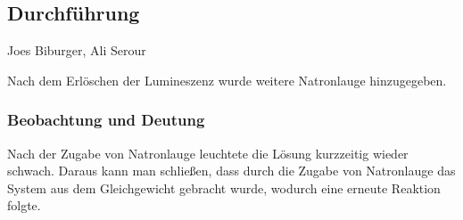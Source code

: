 \subsection{Durchf\"uhrung}
Joes Biburger, Ali Serour

Nach dem Erl\"oschen der Lumineszenz wurde weitere Natronlauge hinzugegeben.
\subsubsection{Beobachtung und Deutung}
Nach der Zugabe von Natronlauge leuchtete die L\"osung kurzzeitig wieder schwach.
Daraus kann man schließen, dass durch die Zugabe von Natronlauge das System aus dem Gleichgewicht gebracht wurde, wodurch eine erneute Reaktion folgte.
